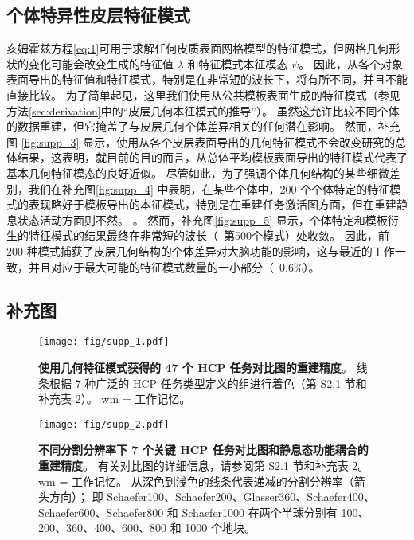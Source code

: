\documentclass[lang=cn,a4paper,newtx]{elegantpaper}
\begin{document}
\subsection{个体特异性皮层特征模式} \label{sec:individual_specific}
亥姆霍兹方程\ref{eq:1}可用于求解任何皮质表面网格模型的特征模式，但网格几何形状的变化可能会改变生成的特征值 $ \lambda $ 和特征模式本征模态 $ \psi $。
因此，从各个对象表面导出的特征值和特征模式，特别是在非常短的波长下，将有所不同，并且不能直接比较\cite{henderson2022empirical,chen2022individuality}。
为了简单起见，这里我们使用从公共模板表面生成的特征模式（参见方法\ref{sec:derivation}中的“皮层几何本征模式的推导”）。
虽然这允许比较不同个体的数据重建，但它掩盖了与皮层几何个体差异相关的任何潜在影响。
然而，补充图 \ref{fig:supp_3} 显示，使用从各个皮层表面导出的几何特征模式不会改变研究的总体结果，这表明，就目前的目的而言，从总体平均模板表面导出的特征模式代表了基本几何特征模态的良好近似。
尽管如此，为了强调个体几何结构的某些细微差别，我们在补充图\ref{fig:supp_4} 中表明，在某些个体中，200 个个体特定的特征模式的表现略好于模板导出的本征模式，特别是在重建任务激活图方面，但在重建静息状态活动方面则不然。 。 
然而，补充图\ref{fig:supp_5} 显示，个体特定和模板衍生的特征模式的结果最终在非常短的波长（~第500个模式）处收敛。
因此，前 200 种模式捕获了皮层几何结构的个体差异对大脑功能的影响，这与最近的工作\cite{chen2022individuality}一致，并且对应于最大可能的特征模式数量的一小部分（~0.6\%）。


\subsection{补充图}

\begin{figure}[!htb] 
	\centering
	\texttt{[image: fig/supp\_1.pdf]}
	\caption{\textbf{使用几何特征模式获得的 47 个 HCP 任务对比图的重建精度}。
		线条根据 7 种广泛的 HCP 任务类型定义的组进行着色（第 S2.1 节和补充表 2）。 wm = 工作记忆。} \label{fig:supp_1}
\end{figure}



\begin{figure}[!htb] 
	\centering
	\texttt{[image: fig/supp\_2.pdf]}
	\caption{\textbf{不同分割分辨率下 7 个关键 HCP 任务对比图和静息态功能耦合的重建精度}。 
		有关对比图的详细信息，请参阅第 S2.1 节和补充表 2。
		wm = 工作记忆。
		从深色到浅色的线条代表递减的分割分辨率（箭头方向）；
		即 Schaefer100、Schaefer200、Glasser360、Schaefer400、Schaefer600、Schaefer800 和 Schaefer1000 在两个半球分别有 100、200、360、400、600、800 和 1000 个地块。} \label{fig:supp_2}
\end{figure}
\end{document}

